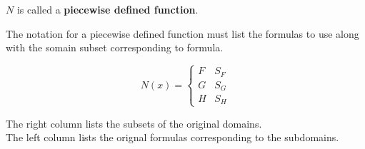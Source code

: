 \documentclass{ximera}
\begin{document}
$N$ is called a \textbf{\textcolor{blue!55!black}{piecewise defined function}}. \\




\begin{notation}


The notation for a piecewise defined function must list the formulas to use along with the somain subset corresponding to formula.



\[
N(x) = 
\begin{cases}
  F & S_F     \\
  G & S_G \\
  H & S_H
\end{cases}
\]



The right column lists the subsets of the original domains.  \\
The left column lists the orignal formulas corresponding to the subdomains.

\end{notation}
\end{document}
